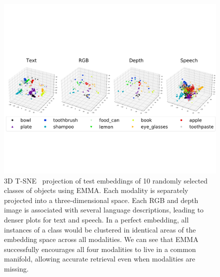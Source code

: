 \documentclass[sigconf,natbib=true,anonymous=true]{acmart}
\newcommand{\todokdinline}[1]{\todo[color=red!20,inline]{{KD: \small #1}}}
\newcommand{\ours}{\textsc{EMMA}}
\begin{document}
\begin{figure}[h]
\centering
\includegraphics[width=1\columnwidth]{Figures/3D-tsne-exp-supcon-emma-lard-64-relu-SGD-0.001-unique_objects-gold-no_neg_sampling-1024-trimmed.pdf}
\caption{3D T-SNE~\citep{van2008tsne} projection of test embeddings of 10 randomly selected classes of objects using \ours{}. Each modality is separately projected into a three-dimensional space. Each RGB and depth image is associated with several language descriptions, leading to denser plots for text and speech. In a perfect embedding, all instances of a class would be clustered in identical areas of the embedding space across all modalities. We can see that \ours{} successfully encourages all four modalities to live in a common manifold, allowing accurate retrieval even when modalities are missing.
}

\label{fig:3d-tsne}
\end{figure}
\end{document}
